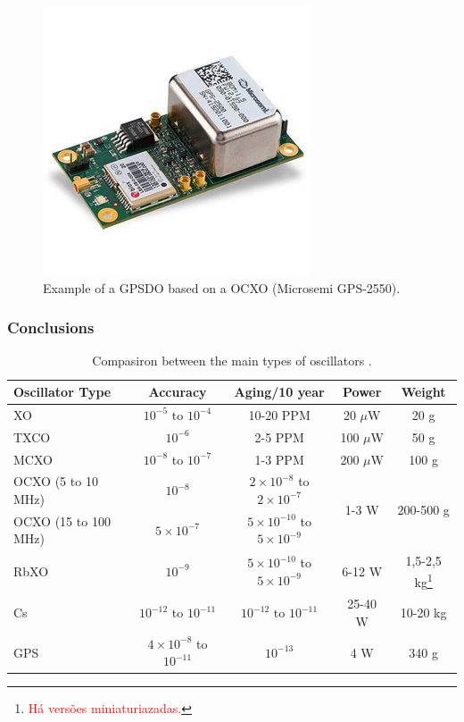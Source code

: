 \begin{figure}[!ht]
    \begin{center}
        \includegraphics[width=0.5\columnwidth]{figures/gps-2550}
        \caption{Example of a GPSDO based on a OCXO (Microsemi GPS-2550).}
        \label{fig:ex-gpsdo}
    \end{center}
\end{figure}

\subsubsection{Conclusions}

\begin{table}[!ht]
    \centering
    \begin{tabular}{lcccc}
        \toprule[1.5pt]
        \textbf{Oscillator Type} & \textbf{Accuracy} & \textbf{Aging/10 year} & \textbf{Power} & \textbf{Weight} \\
        \midrule
        XO                   & $10^{-5}$ to $10^{-4}$   & 10-20 PPM                                 & 20 $\mu$W  & 20 g \\
        TXCO                 & $10^{-6}$                & 2-5 PPM                                   & 100 $\mu$W & 50 g \\
        MCXO                 & $10^{-8}$ to $10^{-7}$   & 1-3 PPM                                   & 200 $\mu$W & 100 g \\
        OCXO (5 to 10 MHz)   & $10^{-8}$                & $2 \times 10^{-8}$ to $2 \times 10^{-7}$  & \multirow{2}{*}{1-3 W} & \multirow{2}{*}{200-500 g} \\
        OCXO (15 to 100 MHz) & $5 \times 10^{-7}$       & $5 \times 10^{-10}$ to $5 \times 10^{-9}$ &            &  \\
        RbXO                 & $10^{-9}$                & $5 \times 10^{-10}$ to $5 \times 10^{-9}$ & 6-12 W & 1,5-2,5 kg\footnote{\textcolor{red}{Há versões miniaturiazadas.}} \\
        Cs                   & $10^{-12}$ to $10^{-11}$ & $10^{-12}$ to $10^{-11}$                  & 25-40 W & 10-20 kg \\
        GPS                  & $4 \times 10^{-8}$ to $10^{-11}$ & $10^{-13}$ & 4 W & 340 g \\
        \bottomrule[1.5pt]
    \end{tabular}
    \caption{Compasiron between the main types of oscillators \cite{mancini2004}.}
    \label{tab:osc-comp}
\end{table}

